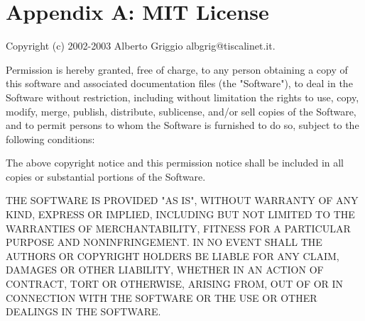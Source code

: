 \documentclass[a4paper,10pt]{report}
\begin{document}
\appendix

\chapter{Appendix A: MIT License}
Copyright (c) 2002-2003 Alberto Griggio  albgrig@tiscalinet.it.

Permission is hereby granted, free of charge, to any person obtaining
a copy of
this software and associated documentation files (the "Software"),
to deal in
the Software without restriction, including without limitation
the rights to
use, copy, modify, merge, publish, distribute, sublicense, and/or
sell copies
of the Software, and to permit persons to whom the Software is
furnished to do
so, subject to the following conditions:

The above copyright notice and this permission notice shall be
included in all
copies or substantial portions of the Software.

THE SOFTWARE IS PROVIDED "AS IS", WITHOUT WARRANTY OF ANY KIND,
EXPRESS OR IMPLIED, INCLUDING BUT NOT LIMITED TO THE WARRANTIES
OF MERCHANTABILITY, FITNESS FOR A PARTICULAR PURPOSE AND NONINFRINGEMENT.
IN NO EVENT SHALL THE AUTHORS OR COPYRIGHT HOLDERS BE LIABLE
FOR ANY CLAIM, DAMAGES OR OTHER LIABILITY, WHETHER IN AN ACTION
OF CONTRACT, TORT OR OTHERWISE, ARISING FROM, OUT OF OR IN CONNECTION
WITH THE SOFTWARE OR THE USE OR OTHER DEALINGS IN THE SOFTWARE.
\end{document}
